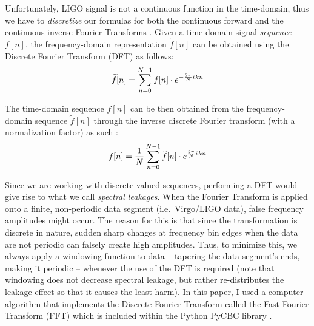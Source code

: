 \documentclass[preprint,
letterpaper,
 amsmath,amssymb,
 aps,
]{revtex4-2}
\newcommand{\iu}{{i\mkern1mu}}
\begin{document}
Unfortunately, LIGO signal is not a continuous function in the time-domain, thus we have to \textit{discretize} our formulas for both the continuous forward and the continuous inverse Fourier Transforms \cite{dsptextbook}. Given a time-domain signal \textit{sequence} $f[n]$, the frequency-domain representation $\widetilde{f}[n]$ can be obtained using the Discrete Fourier Transform (DFT) as follows\cite{roberts_2020}:
\begin{equation}
\widetilde{f}[n]=\sum _{n=0}^{N-1}f[n]\cdot e^{-{\frac {2\pi}{N}\iu kn}}
\end{equation}

The time-domain sequence $f[n]$ can be then obtained from the frequency-domain sequence $\widetilde{f}[n]$ through the inverse discrete Fourier transform (with a normalization factor) as such \cite{roberts_2020}:
\begin{equation}
f[n]=\frac{1}{N}\sum _{n=0}^{N-1}\widetilde{f}[n]\cdot e^{{\frac {2\pi}{N}\iu kn}}
\end{equation}

Since we are working with discrete-valued sequences, performing a DFT would give rise to what we call \textit{spectral leakages}. When the Fourier Transform is applied onto a finite, non-periodic data segment (i.e.\ Virgo/LIGO data), false frequency amplitudes might occur. The reason for this is that since the transformation is discrete in nature, sudden sharp changes at frequency bin edges when the data are not periodic can falsely create high amplitudes. Thus, to minimize this, we always apply a windowing function to data – tapering the data segment's ends, making it periodic – whenever the use of the DFT is required (note that windowing does not decrease spectral leakage, but rather re-distributes the leakage effect so that it causes the least harm). In this paper, I used a computer algorithm that implements the Discrete Fourier Transform called the Fast Fourier Transform (FFT) which is included within the Python PyCBC library \cite{numpy}.
\end{document}

